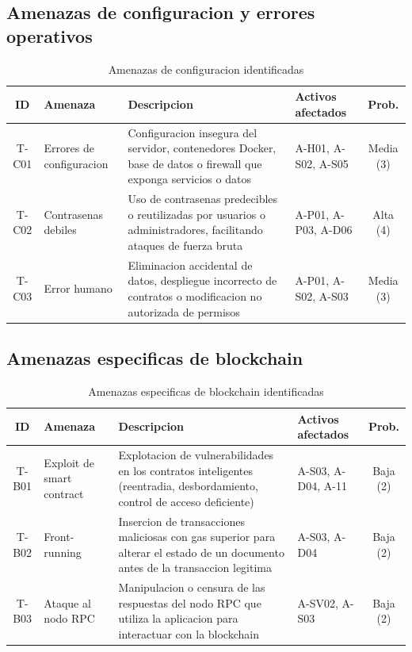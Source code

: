 \documentclass[11pt, a4paper]{article}
\begin{document}
\subsection{Amenazas de configuracion y errores operativos}

\begin{table}[H]
\centering
\renewcommand{\arraystretch}{1.4}
\small
\begin{tabular}{|c|l|p{4.5cm}|l|c|}
\hline
\textbf{ID} & \textbf{Amenaza} & \textbf{Descripcion} & \textbf{Activos afectados} & \textbf{Prob.} \\
\hline
T-C01 & Errores de configuracion & Configuracion insegura del servidor, contenedores Docker, base de datos o firewall que exponga servicios o datos & A-H01, A-S02, A-S05 & Media (3) \\
\hline
T-C02 & Contrasenas debiles & Uso de contrasenas predecibles o reutilizadas por usuarios o administradores, facilitando ataques de fuerza bruta & A-P01, A-P03, A-D06 & Alta (4) \\
\hline
T-C03 & Error humano & Eliminacion accidental de datos, despliegue incorrecto de contratos o modificacion no autorizada de permisos & A-P01, A-S02, A-S03 & Media (3) \\
\hline
\end{tabular}
\caption{Amenazas de configuracion identificadas}
\label{tab:amenazas-config}
\end{table}

\subsection{Amenazas especificas de blockchain}

\begin{table}[H]
\centering
\renewcommand{\arraystretch}{1.4}
\small
\begin{tabular}{|c|l|p{4.5cm}|l|c|}
\hline
\textbf{ID} & \textbf{Amenaza} & \textbf{Descripcion} & \textbf{Activos afectados} & \textbf{Prob.} \\
\hline
T-B01 & Exploit de smart contract & Explotacion de vulnerabilidades en los contratos inteligentes (reentradia, desbordamiento, control de acceso deficiente) & A-S03, A-D04, A-11 & Baja (2) \\
\hline
T-B02 & Front-running & Insercion de transacciones maliciosas con gas superior para alterar el estado de un documento antes de la transaccion legitima & A-S03, A-D04 & Baja (2) \\
\hline
T-B03 & Ataque al nodo RPC & Manipulacion o censura de las respuestas del nodo RPC que utiliza la aplicacion para interactuar con la blockchain & A-SV02, A-S03 & Baja (2) \\
\hline
\end{tabular}
\caption{Amenazas especificas de blockchain identificadas}
\label{tab:amenazas-blockchain}
\end{table}
\end{document}
